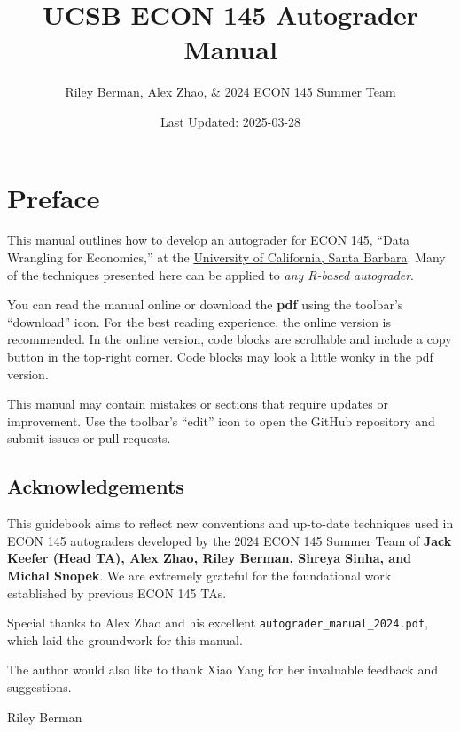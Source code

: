 \documentclass[
  12pt,
]{book}
\title{UCSB ECON 145 Autograder Manual}
\author{Riley Berman, Alex Zhao, \& 2024 ECON 145 Summer Team}
\date{Last Updated: 2025-03-28}
\begin{document}
\maketitle

{
\hypersetup{linkcolor=}
\setcounter{tocdepth}{1}
\tableofcontents
}
\chapter*{Preface}\label{preface}

This manual outlines how to develop an autograder for ECON 145, ``Data Wrangling for Economics,'' at the \href{https://econ.ucsb.edu/programs/undergraduate/courses}{University of California, Santa Barbara}. Many of the techniques presented here can be applied to \emph{any R-based autograder}.

You can read the manual online or download the \textbf{pdf} using the toolbar's ``download'' icon. For the best reading experience, the online version is recommended. In the online version, code blocks are scrollable and include a copy button in the top-right corner. Code blocks may look a little wonky in the pdf version.

This manual may contain mistakes or sections that require updates or improvement. Use the toolbar's ``edit'' icon to open the GitHub repository and submit issues or pull requests.

\section*{Acknowledgements}\label{Acknowledgements}

This guidebook aims to reflect new conventions and up-to-date techniques used in ECON 145 autograders developed by the 2024 ECON 145 Summer Team of \textbf{Jack Keefer (Head TA), Alex Zhao, Riley Berman, Shreya Sinha, and Michal Snopek}. We are extremely grateful for the foundational work established by previous ECON 145 TAs.

Special thanks to Alex Zhao and his excellent \texttt{autograder\_manual\_2024.pdf}, which laid the groundwork for this manual.

The author would also like to thank Xiao Yang for her invaluable feedback and suggestions.

\begin{flushright}
Riley Berman
\end{flushright}
\end{document}
